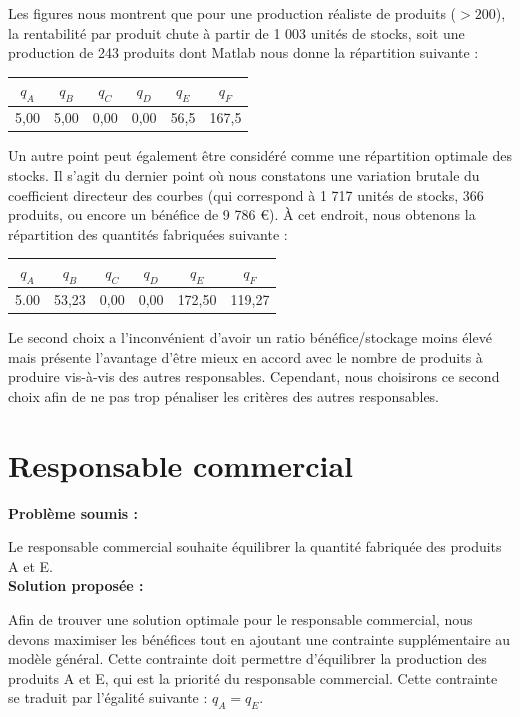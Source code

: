 \documentclass[paper=a4, fontsize=11pt]{report}
\numberwithin{equation}{section}		%
\numberwithin{figure}{section}			%
\numberwithin{table}{section}				%
\renewcommand{\bf}[1]{\textbf{#1}}
\begin{document}
Les figures nous montrent que pour une production réaliste de produits ($> 200$), la rentabilité par produit chute à partir de 1 003 unités de stocks, soit une production de 243 produits dont Matlab nous donne la répartition suivante :

\begin{center}
\begin{tabular}{cccccc}
\hline 
$q_A$ & $q_B$ & $q_C$ & $q_D$ & $q_E$ & $q_F$ \\ 
\hline 
5,00 & 5,00 & 0,00 & 0,00 & 56,5 & 167,5 \\ 
\hline 
\end{tabular} 
\end{center}

Un autre point peut également être considéré comme une répartition optimale des stocks. Il s'agit du dernier point où nous constatons une variation brutale du coefficient directeur des courbes (qui correspond à 1 717 unités de stocks, 366 produits, ou encore un bénéfice de 9 786 €). À cet endroit, nous obtenons la répartition des quantités fabriquées suivante :

\begin{center}
\begin{tabular}{cccccc}
\hline 
$q_A$ & $q_B$ & $q_C$ & $q_D$ & $q_E$ & $q_F$ \\ 
\hline 
5.00 & 53,23 & 0,00 & 0,00 & 172,50 & 119,27 \\ 
\hline 
\end{tabular} 
\end{center}

Le second choix a l'inconvénient d'avoir un ratio bénéfice/stockage moins élevé mais présente l'avantage d'être mieux en accord avec le nombre de produits à produire vis-à-vis des autres responsables. Cependant, nous choisirons ce second choix afin de ne pas trop pénaliser les critères des autres responsables.

\section{Responsable commercial}
\bf{Problème soumis :}

Le responsable commercial souhaite équilibrer la quantité fabriquée des produits A et E.\\

\bf{Solution proposée :}

Afin de trouver une solution optimale pour le responsable commercial, nous devons maximiser les bénéfices tout en ajoutant une contrainte supplémentaire au modèle général. Cette contrainte doit permettre d'équilibrer la production des produits A et E, qui est la priorité du responsable commercial. Cette contrainte se traduit par l'égalité suivante : $q_A = q_E$. \\
\end{document}
